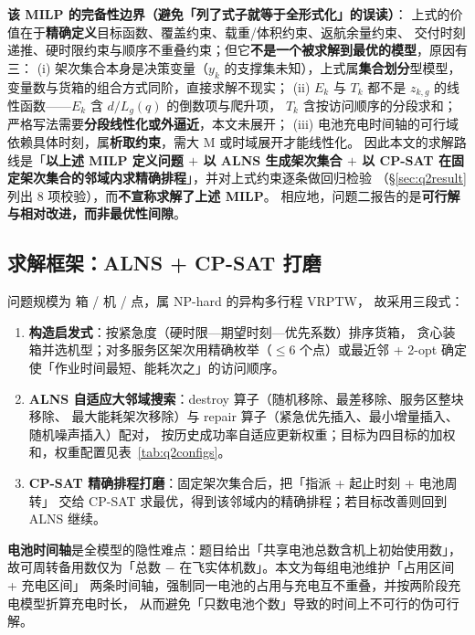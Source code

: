 \documentclass[12pt,a4paper,fontset=windows]{ctexart}
\begin{document}
\noindent\textbf{该 MILP 的完备性边界（避免「列了式子就等于全形式化」的误读）}：
上式的价值在于\textbf{精确定义}目标函数、覆盖约束、载重/体积约束、返航余量约束、
交付时刻递推、硬时限约束与顺序不重叠约束；但它\textbf{不是一个被求解到最优的模型}，原因有三：
(i) 架次集合本身是决策变量（$y_k$ 的支撑集未知），上式属\textbf{集合划分}型模型，
变量数与货箱的组合方式同阶，直接求解不现实；
(ii) $E_k$ 与 $T_k$ 都不是 $z_{k,g}$ 的线性函数——$E_k$ 含 $d/L_g(q)$ 的倒数项与爬升项，
$T_k$ 含按访问顺序的分段求和；严格写法需要\textbf{分段线性化或外逼近}，本文未展开；
(iii) 电池充电时间轴的可行域依赖具体时刻，属\textbf{析取约束}，需大 M 或时域展开才能线性化。
因此本文的求解路线是「\textbf{以上述 MILP 定义问题 $+$ 以 ALNS 生成架次集合
$+$ 以 CP-SAT 在固定架次集合的邻域内求精确排程}」，并对上式约束逐条做回归检验
（\S\ref{sec:q2result} 列出 8 项校验），而\textbf{不宣称求解了上述 MILP}。
相应地，问题二报告的是\textbf{可行解与相对改进，而非最优性间隙}。

\subsection{求解框架：ALNS + CP-SAT 打磨}
问题规模为 \TotalBoxes 箱 / \NumDrones 机 / \NumAreas 点，属 NP-hard 的异构多行程 VRPTW，
故采用三段式：
\begin{enumerate}[leftmargin=2.2em,itemsep=2pt]
\item \textbf{构造启发式}：按紧急度（硬时限—期望时刻—优先系数）排序货箱，
  贪心装箱并选机型；对多服务区架次用精确枚举（$\le6$ 个点）或最近邻 + 2-opt
  确定使「作业时间最短、能耗次之」的访问顺序。
\item \textbf{ALNS 自适应大邻域搜索}：destroy 算子（随机移除、最差移除、服务区整块移除、
  最大能耗架次移除）与 repair 算子（紧急优先插入、最小增量插入、随机噪声插入）配对，
  按历史成功率自适应更新权重；目标为四目标的加权和，权重配置见表~\ref{tab:q2configs}。
\item \textbf{CP-SAT 精确排程打磨}：固定架次集合后，把「指派 + 起止时刻 + 电池周转」
  交给 CP-SAT 求最优，得到该邻域内的精确排程；若目标改善则回到 ALNS 继续。
\end{enumerate}
\textbf{电池时间轴}是全模型的隐性难点：题目给出「共享电池总数含机上初始使用数」，
故可周转备用数仅为「总数 $-$ 在飞实体机数」。本文为每组电池维护「占用区间 + 充电区间」
两条时间轴，强制同一电池的占用与充电互不重叠，并按两阶段充电模型折算充电时长，
从而避免「只数电池个数」导致的时间上不可行的伪可行解。
\end{document}
